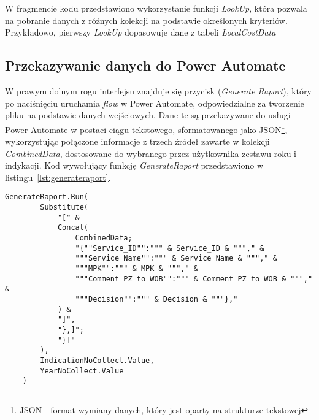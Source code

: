 W fragmencie kodu przedstawiono wykorzystanie funkcji \textit{LookUp}, która pozwala na pobranie danych z różnych kolekcji na podstawie określonych kryteriów. Przykładowo, pierwszy \textit{LookUp} dopasowuje dane z tabeli \textit{LocalCostData}



\subsection{Przekazywanie danych do Power Automate}

W prawym dolnym rogu interfejsu znajduje się przycisk (\textit{Generate Raport}), który po naciśnięciu uruchamia \textit{flow} w Power Automate, odpowiedzialne za tworzenie pliku na podstawie danych wejściowych. Dane te są przekazywane do usługi Power Automate w postaci ciągu tekstowego, sformatowanego jako JSON\footnote{JSON - format wymiany danych, który jest oparty na strukturze tekstowej}, wykorzystując połączone informacje z trzech źródeł zawarte w kolekcji \textit{CombinedData}, dostosowane do wybranego przez użytkownika zestawu roku i indykacji. Kod wywołujący funkcję \textit{GenerateRaport} przedstawiono w listingu~\ref{lst:generateraport}.



\begin{lstlisting}[language=PowerFx, caption={Kod wywołujący funkcję GenerateRaport}, label={lst:generateraport}]
    GenerateRaport.Run(
        Substitute(
            "[" & 
            Concat(
                CombinedData;
                "{""Service_ID"":""" & Service_ID & """," &
                """Service_Name"":""" & Service_Name & """," &
                """MPK"":""" & MPK & """," &
                """Comment_PZ_to_WOB"":""" & Comment_PZ_to_WOB & """," &
                """Decision"":""" & Decision & """},"
            ) & 
            "]",
            "},]"; 
            "}]"
        ),
        IndicationNoCollect.Value,
        YearNoCollect.Value
    )
    \end{lstlisting}

